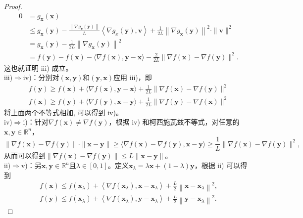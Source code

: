 \begin{proof}
\begin{equation}
\begin{aligned}
0 &=g_{\bm{x}}(\bm{x}) \\
& \leq g_{\bm{x}}(\bm{y})-\frac{\left\|\nabla g_{\bm{x}}(\bm{y})\right\|}{L}\left\langle\nabla g_{x}(\bm{y}), \bm{v}\right\rangle+\frac{1}{2 L}\left\|\nabla g_{\bm{x}}(\bm{y})\right\|^{2} \cdot\|\bm{v}\|^{2} \\
&=g_{\bm{x}}(\bm{y})-\frac{1}{2 L}\left\|\nabla g_{\bm{x}}(\bm{y})\right\|^{2} \\
&=f(\bm{y})-f(\bm{x})-\langle\nabla f(\bm{x}), \bm{y}-\bm{x}\rangle-\frac{2}{2 L}\|\nabla f(\bm{x})-\nabla f(\bm{y})\|^{2} .
    \end{aligned}
    \nonumber
\end{equation}
这也就证明 iii) 成立。\\
iii)$ \Rightarrow  $iv)：分别对$  (\bm{x}, \bm{y})  $和$  (\bm{y}, \bm{x})  $应用 iii)，即
\begin{equation}
\begin{array}{l}
f(\bm{y}) \geq f(\bm{x})+\langle\nabla f(\bm{x}), \bm{y}-\bm{x}\rangle+\frac{1}{2 L}\|\nabla f(\bm{x})-\nabla f(\bm{y})\|^{2} \\
f(\bm{x}) \geq f(\bm{y})+\langle\nabla f(\bm{y}), \bm{x}-\bm{y}\rangle+\frac{1}{2 L}\|\nabla f(\bm{y})-\nabla f(\bm{x})\|^{2}
\end{array}
    \nonumber
\end{equation}
将上面两个不等式相加, 可以得到 iv)。 \\
iv)$  \Rightarrow  $i)：针对$  \nabla f(\bm{x}) \neq \nabla f(\bm{y}) $，根据 iv) 和柯西施瓦兹不等式，对任意的$\bm{x}, \bm{y} \in \mathbb{R}^{n}$，
\begin{equation}
\|\nabla f(\bm{x})-\nabla f(\bm{y})\| \cdot\|\bm{x}-\bm{y}\| \geq\langle\nabla f(\bm{x})-\nabla f(\bm{y}), \bm{x}-\bm{y}\rangle \geq \frac{1}{L}\|\nabla f(\bm{x})-\nabla f(\bm{y})\|^{2} ,
    \nonumber
\end{equation}
从而可以得到$  \|\nabla f(\bm{x})-\nabla f(\bm{y})\| \leq L\|\bm{x}-\bm{y}\|  $。 \\
ii)$  \Rightarrow $v)：另$  \bm{x}, \bm{y} \in \mathbb{R}^{n}  $且$  \lambda \in[0,1]  $。定义$  \bm{x}_{\lambda}=\lambda \bm{x}+(1-\lambda) \bm{y} $，根据 ii) 可以得到
\begin{equation}
\begin{array}{l}
f(\bm{x}) \leq f\left(\bm{x}_{\lambda}\right)+\left\langle\nabla f\left(\bm{x}_{\lambda}\right), \bm{x}-\bm{x}_{\lambda}\right\rangle+\frac{L}{2}\left\|\bm{x}-\bm{x}_{\lambda}\right\|^{2}, \\
f(\bm{y}) \leq f\left(\bm{x}_{\lambda}\right)+\left\langle\nabla f\left(\bm{x}_{\lambda}\right), \bm{y}-\bm{x}_{\lambda}\right\rangle+\frac{L}{2}\left\|\bm{y}-\bm{x}_{\lambda}\right\|^{2} .

\end{array}
\end{equation}
\end{proof}
